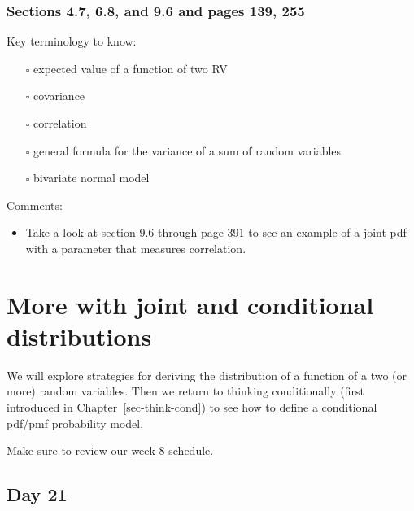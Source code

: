 \documentclass[
  letterpaper,
]{scrbook}
\providecommand{\tightlist}{%
  \setlength{\itemsep}{0pt}\setlength{\parskip}{0pt}}\usepackage{longtable,booktabs,array}
\begin{document}
\subsection*{Sections 4.7, 6.8, and 9.6 and pages 139,
255}\label{sections-4.7-6.8-and-9.6-and-pages-139-255}

Key terminology to know:

\begin{itemize}
\tightlist
\item[$\square$]
  expected value of a function of two RV
\item[$\square$]
  covariance
\item[$\square$]
  correlation
\item[$\square$]
  general formula for the variance of a sum of random variables
\item[$\square$]
  bivariate normal model
\end{itemize}

Comments:

\begin{itemize}
\tightlist
\item
  Take a look at section 9.6 through page 391 to see an example of a
  joint pdf with a parameter that measures correlation.
\end{itemize}


\chapter{More with joint and conditional
distributions}\label{sec-more-joint-dist}

We will explore strategies for deriving the distribution of a function
of a two (or more) random variables. Then we return to thinking
conditionally (first introduced in Chapter~\ref{sec-think-cond}) to see
how to define a conditional pdf/pmf probability model.

Make sure to review our
\href{https://docs.google.com/spreadsheets/d/1RrtZ7JiEBz_r4XMC7Eib2ObRZpGSXkg2fVV1h8YrnUw/edit?usp=sharing}{week
8 schedule}.

\section*{Day 21}\label{day-21}

\end{document}

